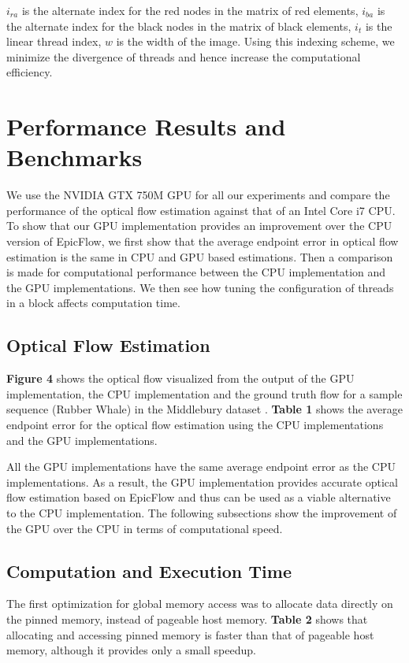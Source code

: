 \documentclass[english]{article}
\newcommand{\csvautotabularcenter}[2][]{\csvloop{autotabularcenter={#2},#1}}
\begin{document}
	 $i_{ra}$ is the alternate index for the red nodes in the matrix of red elements, $i_{ba}$ is the alternate index for the black nodes in the matrix of black elements, $i_t$ is the linear thread index, $w$ is the width of the image. Using this indexing scheme, we minimize the divergence of threads and hence increase the computational efficiency.

	\section{Performance Results and Benchmarks}
	We use the NVIDIA GTX 750M GPU for all our experiments and compare the performance of the optical flow estimation against that of an Intel Core i7 CPU. To show that our GPU implementation provides an improvement over the CPU version of EpicFlow, we first show that the average endpoint error in optical flow estimation is the same in CPU and GPU based estimations. Then a comparison is made for computational performance between the CPU implementation and the GPU implementations. We then see how tuning the configuration of threads in a block affects computation time.

	\subsection{Optical Flow Estimation}
	\textbf{Figure 4} shows the optical flow visualized from the output of the GPU implementation, the CPU implementation and the ground truth flow for a sample sequence (Rubber Whale) in the Middlebury dataset \cite{12}. \textbf{Table 1} shows the average endpoint error for the optical flow estimation using the CPU implementations and the GPU implementations.
	
	\begin{center}
	\centering
	\csvautotabularcenter{results/tables/1_aee.csv}	
	\end{center}

	All the GPU implementations have the same average endpoint error as the CPU implementations. As a result, the GPU implementation provides accurate optical flow estimation based on EpicFlow and thus can be used as a viable alternative to the CPU implementation. The following subsections show the improvement of the GPU over the CPU in terms of computational speed.	

	\subsection{Computation and Execution Time}
	The first optimization for global memory access was to allocate data directly on the pinned memory, instead of pageable host memory. \textbf{Table 2} shows that allocating and accessing pinned memory is faster than that of pageable host memory, although it provides only a small speedup.
\end{document}
